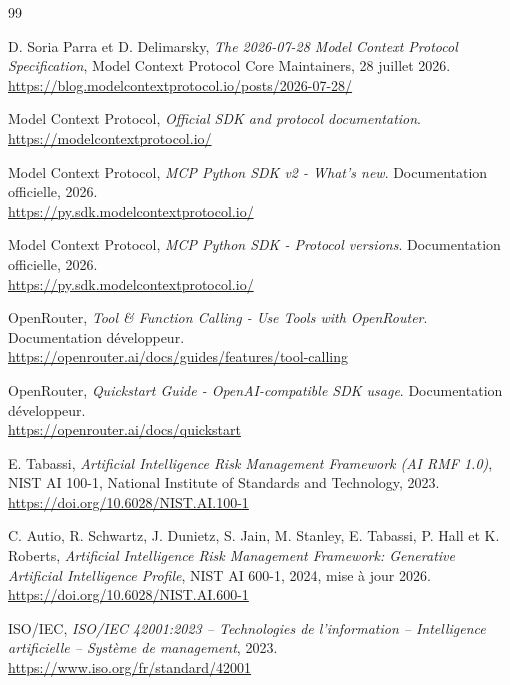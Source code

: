 \begin{thebibliography}{99}

D. Soria Parra et D. Delimarsky, \emph{The 2026-07-28 Model Context Protocol Specification}, Model Context Protocol Core Maintainers, 28 juillet 2026.\\
\url{https://blog.modelcontextprotocol.io/posts/2026-07-28/}

Model Context Protocol, \emph{Official SDK and protocol documentation}.\\
\url{https://modelcontextprotocol.io/}

Model Context Protocol, \emph{MCP Python SDK v2 - What's new}. Documentation officielle, 2026.\\
\url{https://py.sdk.modelcontextprotocol.io/}

Model Context Protocol, \emph{MCP Python SDK - Protocol versions}. Documentation officielle, 2026.\\
\url{https://py.sdk.modelcontextprotocol.io/}

OpenRouter, \emph{Tool \& Function Calling - Use Tools with OpenRouter}. Documentation développeur.\\
\url{https://openrouter.ai/docs/guides/features/tool-calling}

OpenRouter, \emph{Quickstart Guide - OpenAI-compatible SDK usage}. Documentation développeur.\\
\url{https://openrouter.ai/docs/quickstart}

E. Tabassi, \emph{Artificial Intelligence Risk Management Framework (AI RMF 1.0)}, NIST AI 100-1, National Institute of Standards and Technology, 2023.\\
\url{https://doi.org/10.6028/NIST.AI.100-1}

C. Autio, R. Schwartz, J. Dunietz, S. Jain, M. Stanley, E. Tabassi, P. Hall et K. Roberts, \emph{Artificial Intelligence Risk Management Framework: Generative Artificial Intelligence Profile}, NIST AI 600-1, 2024, mise à jour 2026.\\
\url{https://doi.org/10.6028/NIST.AI.600-1}

ISO/IEC, \emph{ISO/IEC 42001:2023 -- Technologies de l'information -- Intelligence artificielle -- Système de management}, 2023.\\
\url{https://www.iso.org/fr/standard/42001}


\end{thebibliography}

